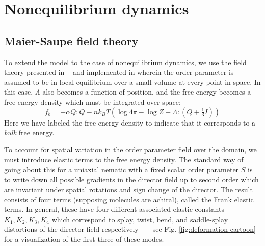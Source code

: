 \documentclass[reqno]{article}
\begin{document}
  \section{Nonequilibrium dynamics} \label{nonequilibrium-dynamics}

  \subsection{Maier-Saupe field theory}
  To extend the model to the case of nonequilibrium dynamics, we use the field
  theory presented in ~\cite{ball_nematic_2010} and implemented in
  \cite{schimming_computational_2020} wherein the order parameter is assumed to
  be in local equilibrium over a small volume at every point in space.
  In this case, $\Lambda$ also becomes a function of position, and the free
  energy becomes a free energy density which must be integrated over space:
  \begin{equation}
    f_b
    =
    -\alpha Q : Q
    - n k_B T \left(\log 4 \pi - \log Z + \Lambda : \left(Q + \tfrac13 I \right) \right)
  \end{equation}
  Here we have labeled the free energy density to indicate that it corresponds
  to a \textit{bulk} free energy.
  
  To account for spatial variation in the order parameter field over the domain,
  we must introduce elastic terms to the free energy density.
  The standard way of going about this for a uniaxial nematic with a fixed
  scalar order parameter $S$ is to write down all possible gradients in the
  director field up to second order which are invariant under spatial rotations
  and sign change of the director.
  The result consists of four terms (supposing molecules are achiral), called
  the Frank elastic terms.
  In general, these have four different associated elastic constants $K_1, K_2,
  K_3, K_4$ which correspond to splay, twist, bend, and saddle-splay distortions of the
  director field respectively ~\cite{selinger_introduction_2016}
  -- see Fig. \ref{fig:deformation-cartoon} for a visualization of the first
  three of these modes.
  
\end{document}
